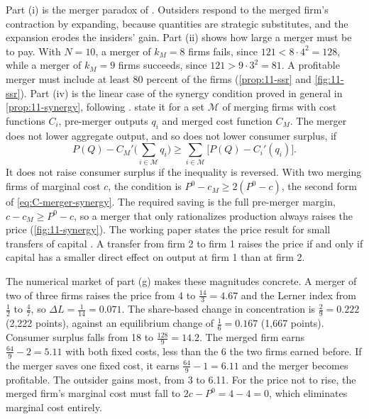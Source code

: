 Part (i) is the merger paradox of \citet{SalantSwitzerReynolds1983}. Outsiders respond to the merged firm's
contraction by expanding, because quantities are strategic substitutes, and the expansion erodes the
insiders' gain. Part (ii) shows how large a merger must be to pay. With $N = 10$, a merger of $k_M = 8$ firms
fails, since $121 < 8 \cdot 4^2 = 128$, while a merger of $k_M = 9$ firms succeeds, since $121 > 9\cdot 3^2 = 81$.
A profitable merger must include at least 80 percent of the firms (\cref{prop:11-ssr} and \cref{fig:11-ssr}). Part (iv) is the
linear case of the synergy condition proved in general in \cref{prop:11-synergy}, following
\citet{FarrellShapiro1990}. \citet[eq.~6, pp.~228--229]{AskerNocke2021} state it for a set $\mathcal{M}$ of merging
firms with cost functions $C_i$, pre-merger outputs $q_i$ and merged cost function $C_M$. The merger does not lower
aggregate output, and so does not lower consumer surplus, if
\begin{equation*}
P(Q) - C_M'\Big(\sum_{i \in \mathcal{M}}q_i\Big) \ge \sum_{i \in \mathcal{M}}\big[P(Q) - C_i'(q_i)\big] .
\end{equation*}
It does not raise consumer surplus if the inequality is reversed. With two merging firms of marginal cost $c$, the condition is
$P^0 - c_M \ge 2(P^0 - c)$, the second form of \eqref{eq:C-merger-synergy}. The required saving is the full
pre-merger margin, $c - c_M \ge P^0 - c$, so a merger that only rationalizes production always raises the price
(\cref{fig:11-synergy}). The working paper states the price result for small transfers of capital
\citep[Proposition~2, p.~13]{FarrellShapiro1988}. A transfer from firm 2 to firm 1 raises the price if and only if
capital has a smaller direct effect on output at firm 1 than at firm 2.

The numerical market of part (g) makes these magnitudes concrete. A merger of two of three firms raises the
price from 4 to $\frac{14}{3} = 4.67$ and the Lerner index from $\frac{1}{2}$ to $\frac{4}{7}$, so
$\Delta L = \frac{1}{14} = 0.071$. The share-based change in concentration is $\frac{2}{9} = 0.222$ (2,222
points), against an equilibrium change of $\frac{1}{6} = 0.167$ (1,667 points). Consumer surplus falls from 18
to $\frac{128}{9} = 14.2$. The merged firm earns $\frac{64}{9} - 2 = 5.11$ with both fixed costs, less than
the 6 the two firms earned before. If the merger saves one fixed cost, it earns $\frac{64}{9} - 1 = 6.11$ and
the merger becomes profitable. The outsider gains most, from 3 to 6.11. For the price not to rise, the merged
firm's marginal cost must fall to $2c - P^0 = 4 - 4 = 0$, which eliminates marginal cost entirely.

